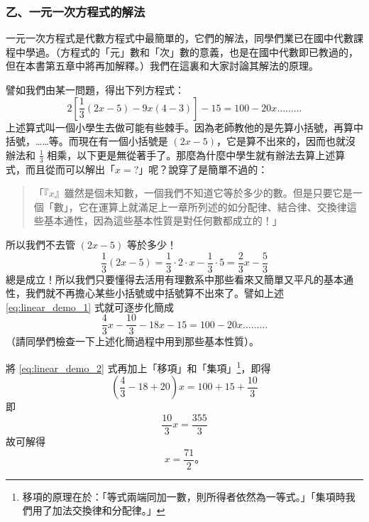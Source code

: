 \subsubsection*{乙、一元一次方程式的解法}\label{subsec:4-2-b}

一元一次方程式是代數方程式中最簡單的，它們的解法，同學們業已在國中代數課程中學過。（方程式的「元」數和「次」數的意義，也是在國中代數即已教過的，但在本書第五章中將再加解釋。）我們在這裏和大家討論其解法的原理。

譬如我們由某一問題，得出下列方程式：
\begin{equation}\label{eq:linear_demo_1}
  2 \left[ \frac{1}{3} (2x-5) - 9x(4-3) \right] - 15 = 100 - 20x \dots\dots\dots
\end{equation}
上述算式叫一個小學生去做可能有些棘手。因為老師教他的是先算小括號，再算中括號，……等。而現在有一個小括號是 $(2x-5)$，它是算不出來的，因而也就沒辦法和 $\frac{1}{3}$ 相乘，以下更是無從著手了。那麼為什麼中學生就有辦法去算上述算式，而且從而可以解出「$x=?$」呢？說穿了是簡單不過的：

\begin{quote}
「『$x$』雖然是個未知數，一個我們不知道它等於多少的數。但是只要它是一個「數」，它在運算上就滿足上一章所列述的如分配律、結合律、交換律這些基本通性，因為這些基本性質是對任何數都成立的！」
\end{quote}

所以我們不去管 $(2x-5)$ 等於多少！
\begin{equation*}
  \frac{1}{3}(2x-5) = \frac{1}{3} \cdot 2 \cdot x - \frac{1}{3} \cdot 5 = \frac{2}{3}x - \frac{5}{3}
\end{equation*}
總是成立！所以我們只要懂得去活用有理數系中那些看來又簡單又平凡的基本通性，我們就不再擔心某些小括號或中括號算不出來了。譬如上述 \eqref{eq:linear_demo_1} 式就可逐步化簡成
\begin{equation}\label{eq:linear_demo_2}
  \frac{4}{3}x - \frac{10}{3} - 18x - 15 = 100 - 20x \dots\dots\dots
\end{equation}
（請同學們檢查一下上述化簡過程中用到那些基本性質）。

將 \eqref{eq:linear_demo_2} 式再加上「移項」和「集項」\footnote{移項的原理在於：「等式兩端同加一數，則所得者依然為一等式。」「集項時我們用了加法交換律和分配律。」}，即得
\begin{equation*}
  \left( \frac{4}{3} - 18 + 20 \right) x = 100 + 15 + \frac{10}{3}
\end{equation*}
即
\begin{equation*}
  \frac{10}{3}x = \frac{355}{3}
\end{equation*}
故可解得
\begin{equation*}
  x = \frac{71}{2} \text{。}
\end{equation*}

